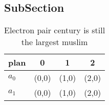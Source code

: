 \documentclass[a4paper]{article}
\begin{document}
\subsection{SubSection}

\begin{table}
\begin{adjustbox}{width=0.6\columnwidth}
\begin{tabular}{|l|l|l|l|}
\hline
\textbf{plan} & \multicolumn{1}{c|}{\textbf{0}} & \multicolumn{1}{c|}{\textbf{1}} & \multicolumn{1}{c|}{\textbf{2}} \\ \hline
\textbf{$a_0$}  & (0,0) & (1,0) & (2,0) \\ \hline
\textbf{$a_1$}  & (0,0) & (1,0) & (2,0) \\ \hline
\end{tabular}
\end{adjustbox}
\caption{Electron pair century is still the largest muslim
}
\end{table}
\end{document}
